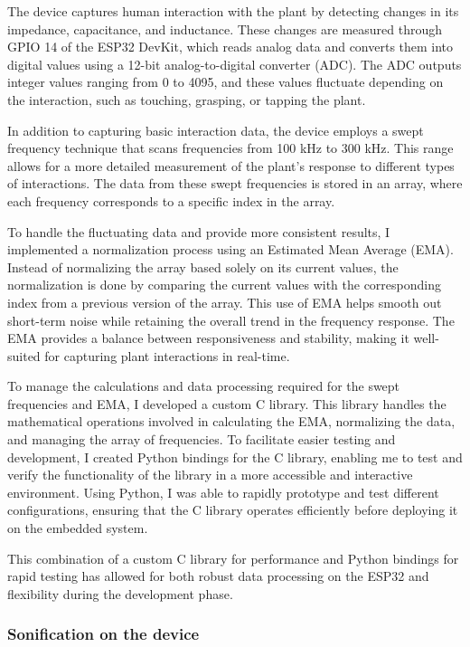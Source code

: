 The device captures human interaction with the plant by detecting changes in its impedance, capacitance, and inductance. These changes are measured through GPIO 14 of the ESP32 DevKit, which reads analog data and converts them into digital values using a 12-bit analog-to-digital converter (ADC). The ADC outputs integer values ranging from 0 to 4095, and these values fluctuate depending on the interaction, such as touching, grasping, or tapping the plant.

In addition to capturing basic interaction data, the device employs a swept frequency technique that scans frequencies from 100 kHz to 300 kHz. This range allows for a more detailed measurement of the plant’s response to different types of interactions. The data from these swept frequencies is stored in an array, where each frequency corresponds to a specific index in the array.

To handle the fluctuating data and provide more consistent results, I implemented a normalization process using an Estimated Mean Average (EMA). Instead of normalizing the array based solely on its current values, the normalization is done by comparing the current values with the corresponding index from a previous version of the array. This use of EMA helps smooth out short-term noise while retaining the overall trend in the frequency response. The EMA provides a balance between responsiveness and stability, making it well-suited for capturing plant interactions in real-time.

To manage the calculations and data processing required for the swept frequencies and EMA, I developed a custom C library. This library handles the mathematical operations involved in calculating the EMA, normalizing the data, and managing the array of frequencies. To facilitate easier testing and development, I created Python bindings for the C library, enabling me to test and verify the functionality of the library in a more accessible and interactive environment. Using Python, I was able to rapidly prototype and test different configurations, ensuring that the C library operates efficiently before deploying it on the embedded system.

This combination of a custom C library for performance and Python bindings for rapid testing has allowed for both robust data processing on the ESP32 and flexibility during the development phase.


\subsubsection{Sonification on the device} %

